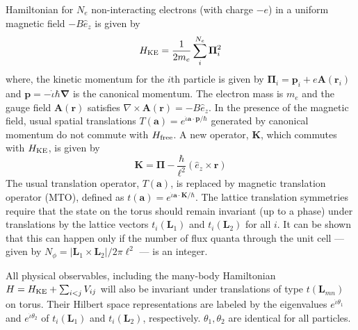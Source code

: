 \documentclass[prb,aps,epsfig,longbibliography,twocolumn]{revtex4-1}
\newcommand{\bsym}[1]{\boldsymbol{#1}}
\newcommand{\rbkt}[1]{\left( #1\right)}
\newcommand{\np}{N_{\phi}}
\newcommand{\iiota}{\dot{\iota}}
\begin{document}
Hamiltonian for $N_e$ non-interacting electrons (with charge $-e$) in a uniform magnetic field $-{B}\hat{e}_z$ is given by 
\begin{equation}
H_{\text{\rm KE}} = \frac{1}{2m_e}\sum_{i}^{N_e} \bsym{\Pi}^{2}_i 
\label{Hfree}
\end{equation}
where, the kinetic momentum for the $i$th particle is given by $\bsym{\Pi}_i = \bsym{p}_i  + e \bsym{A}(\bsym{r}_i)$ and $\bsym{p} = - {\iiota}\hbar\bsym{\nabla}$ is the canonical momentum. The electron mass is $m_e$ and the gauge field $\bsym{A}(\bsym{r})$ satisfies $\nabla \times \bsym{A}(\bsym{r}) =-{B}\hat{e}_z$. In the presence of the magnetic field, usual spatial translations $T(\bsym{a})=e^{{\iiota}\bsym{a}\cdot \bsym{p}/\hbar}$ generated by canonical momentum do not commute with $H_{\rm free}$. A new operator, $\bsym{K}$, which commutes with $H_{\rm KE}$, is given by 
\begin{equation} \label{eq::2.1}
\bsym{K} = \bsym{\Pi} - \frac{\hbar}{\ell^2} \rbkt{\hat{e}_z\times \bsym{r}}
\end{equation}
 The usual translation operator, $T(\bsym{a})$, is replaced by magnetic translation operator (MTO), defined as  $t(\bsym{a})=e^{{\iiota}\bsym{a}\cdot \bsym{K}/\hbar}$.\cite{Brown64}  The lattice translation symmetries require that the state on the torus should remain invariant (up to a phase) under translations by the lattice vectors $t_i(\bsym{L}_1)$ and $t_i(\bsym{L}_2)$ for all $i$. It can be shown that this can happen only if the number of flux quanta through the unit cell --- given by $\np=\left|{\bsym{L}_1\times \bsym{L}_2}\right|/{2\pi\ell^2}$ --- is an integer.

All physical observables, including the many-body Hamiltonian $H = H_{\text{\rm KE}} + \sum_{i<j} V_{ij}$ will also be invariant under translations of type $t(\bsym{L}_{mn})$  on torus. Their Hilbert space representations are labeled by the eigenvalues $e^{\iiota \theta_1}$ and $e^{\iiota \theta_2}$ of $t_i(\bsym{L}_1)$ and $t_i(\bsym{L}_2)$, respectively. $\theta_1,\theta_2$ are identical for all particles.
\end{document}
